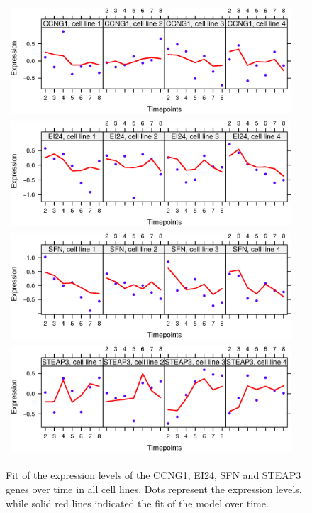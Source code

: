 \begin{figure}[h!]
\centering
\begin{tabular}{cc}
\includegraphics[scale=0.7]{fit2obs_CCNG1.eps}
\\
\includegraphics[scale=0.7]{fit2obs_EI24.eps}
\\
\includegraphics[scale=0.7]{fit2obs_SFN.eps}
\\
\includegraphics[scale=0.7]{fit2obs_STEAP3.eps}
\end{tabular}
\caption{Fit of the expression levels of the CCNG1, EI24, SFN and STEAP3 genes over time in all cell lines. Dots represent the expression levels, while solid red lines indicated the fit of the model over time.}
\label{figSM:genewiseFits}
\end{figure}
\afterpage{\clearpage}


